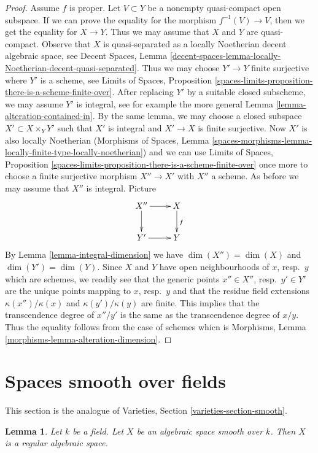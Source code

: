 \documentclass{stacks-project}
\theoremstyle{plain}
\newtheorem{lemma}[subsection]{Lemma}
\theoremstyle{definition}
\theoremstyle{remark}
\numberwithin{equation}{subsection}
\begin{document}
\begin{proof}
\medskip\noindent
Assume $f$ is proper.
Let $V \subset Y$ be a nonempty quasi-compact open subspace.
If we can prove the equality for the morphism $f^{-1}(V) \to V$,
then we get the equality for $X \to Y$. Thus we may assume that
$X$ and $Y$ are quasi-compact.
Observe that $X$ is quasi-separated as
a locally Noetherian decent algebraic space, see
Decent Spaces, Lemma
\ref{decent-spaces-lemma-locally-Noetherian-decent-quasi-separated}.
Thus we may choose $Y' \to Y$ finite surjective where $Y'$
is a scheme, see Limits of Spaces, Proposition
\ref{spaces-limits-proposition-there-is-a-scheme-finite-over}.
After replacing $Y'$ by a suitable closed subscheme, we
may assume $Y'$ is integral, see for example the more general
Lemma \ref{lemma-alteration-contained-in}.
By the same lemma, we may choose a closed subspace
$X' \subset X \times_Y Y'$ such that $X'$ is integral
and $X' \to X$ is finite surjective.
Now $X'$ is also locally Noetherian
(Morphisms of Spaces, Lemma
\ref{spaces-morphisms-lemma-locally-finite-type-locally-noetherian})
and we can use Limits of Spaces, Proposition
\ref{spaces-limits-proposition-there-is-a-scheme-finite-over}
once more to choose a finite surjective morphism $X'' \to X'$
with $X''$ a scheme. As before we may assume that $X''$
is integral. Picture
$$
\xymatrix{
X'' \ar[d] \ar[r] & X \ar[d]^f \\
Y' \ar[r] & Y
}
$$
By Lemma \ref{lemma-integral-dimension} we have $\dim(X'') = \dim(X)$
and $\dim(Y') = \dim(Y)$. Since $X$ and $Y$ have open neighbourhoods
of $x$, resp.\ $y$ which are schemes, we readily see that the generic
points $x'' \in X''$, resp.\ $y' \in Y'$ are the unique points mapping
to $x$, resp.\ $y$ and that the residue field extensions
$\kappa(x'')/\kappa(x)$ and $\kappa(y')/\kappa(y)$ are finite.
This implies that the transcendence degree of $x''/y'$ is the
same as the transcendence degree of $x/y$. Thus the equality follows
from the case of schemes whicn is
Morphisms, Lemma \ref{morphisms-lemma-alteration-dimension}.
\end{proof}





\section{Spaces smooth over fields}
\label{section-smooth}

\noindent
This section is the analogue of
Varieties, Section \ref{varieties-section-smooth}.

\begin{lemma}
\label{lemma-smooth-regular}
Let $k$ be a field.
Let $X$ be an algebraic space smooth over $k$.
Then $X$ is a regular algebraic space.
\end{lemma}
\end{document}
